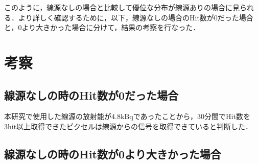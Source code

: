 このように，線源なしの場合と比較して優位な分布が線源ありの場合に見られる．より詳しく確認するために，以下，線源なしの場合のHit数が0だった場合と，0より大きかった場合に分けて，結果の考察を行なった．

\section{考察}
\label{sec:selfsum}
\subsection*{線源なしの時のHit数が0だった場合}
本研究で使用した線源の放射能が$4.8 \mathrm{kBq}$であったことから，30分間でHit数を3hit以上取得できたピクセルは線源からの信号を取得できていると判断した．

\subsection*{線源なしの時のHit数が0より大きかった場合}
